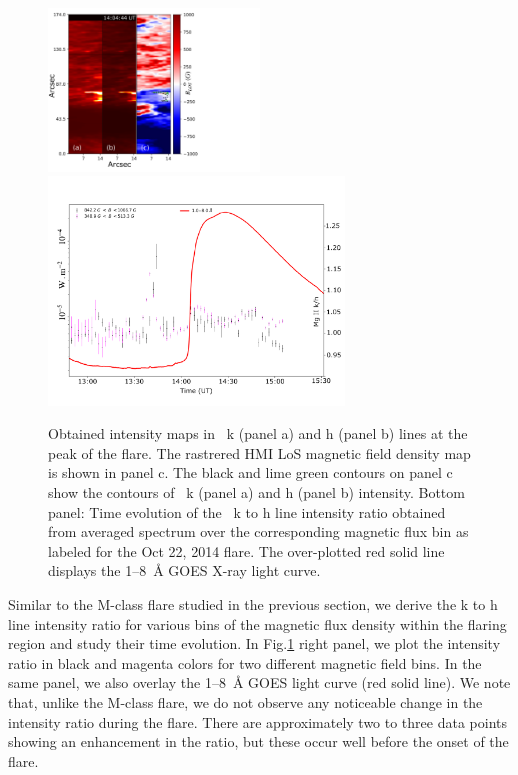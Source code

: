 \begin{figure}[ht!]
    \centering
    \includegraphics[trim={0.1cm 0.2cm 8cm 0.2cm},clip,width=0.5\textwidth]{Figures/contour_paper_plot_oct28.pdf}
    \includegraphics[trim={0.1cm 1cm 0.1cm 1cm},clip,width=0.7\textwidth]{Figures/Oct-22-2014-optical-dep-ev-2.pdf}
    \caption[Top panel: ~h and k line intensity observation with artificially rastered HMI LoS magnetic field for the October 22, 2014 flare.]{Obtained intensity maps in  ~k (panel a) and h (panel b) lines at the peak of the flare. The rastrered HMI LoS magnetic field density map is shown in panel c. The black and lime green contours on panel c show the contours of  ~k (panel a) and h (panel b) intensity. Bottom panel: Time evolution of the ~k to h line intensity ratio obtained from averaged spectrum over the corresponding magnetic flux bin as labeled for the Oct 22, 2014 flare. The over-plotted red solid line displays the 1{--}8~{\AA} GOES X-ray light curve.}
\label{fig:align_raster_flare2}
\end{figure}

Similar to the M-class flare studied in the previous section, we derive the   k to h line intensity ratio for various bins of the magnetic flux density within the flaring region and study their time evolution. In Fig.\ref{fig:align_raster_flare2} right panel, we plot the intensity ratio in black and magenta colors for two different magnetic field bins. In the same panel, we also overlay the 1{--}8~{\AA} GOES light curve (red solid line). We note that, unlike the M-class flare, we do not observe any noticeable change in the intensity ratio during the flare. There are approximately two to three data points showing an enhancement in the ratio, but these occur well before the onset of the flare.

